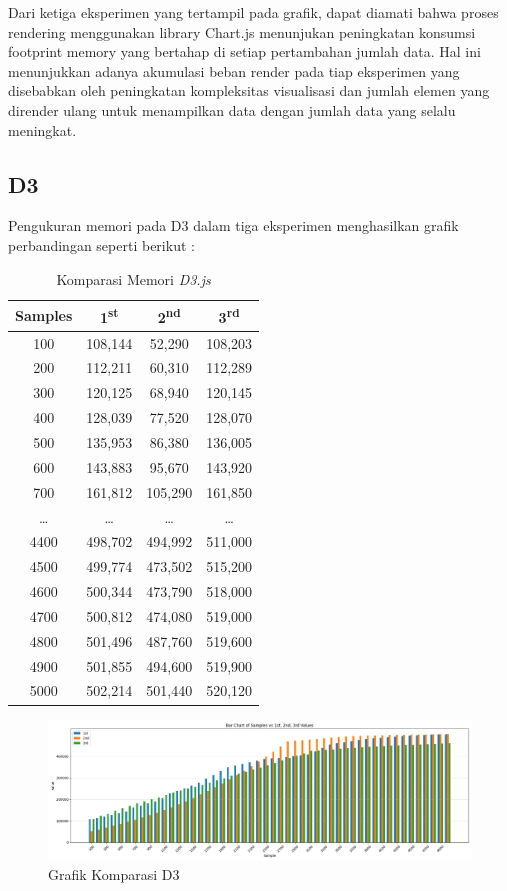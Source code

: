 Dari ketiga eksperimen yang tertampil pada grafik, dapat diamati bahwa proses rendering menggunakan library Chart.js menunjukan peningkatan konsumsi footprint memory yang bertahap di setiap pertambahan jumlah data. Hal ini menunjukkan adanya akumulasi beban render pada tiap eksperimen yang disebabkan oleh peningkatan kompleksitas visualisasi dan jumlah elemen yang dirender ulang untuk menampilkan data dengan jumlah data yang selalu meningkat. 

\subsection{D3}
Pengukuran memori pada D3 dalam tiga eksperimen menghasilkan grafik perbandingan seperti berikut :
\begin{table}[H]
	\centering
	\caption{Komparasi Memori \textit{D3.js}}
	\begin{tabular}{|c|c|c|c|}
		\hline
		\textbf{Samples} & \textbf{1\textsuperscript{st}} & \textbf{2\textsuperscript{nd}} & \textbf{3\textsuperscript{rd}} \\
		\hline
		100  & 108{,}144 &  52{,}290 & 108{,}203 \\
		200  & 112{,}211 &  60{,}310 & 112{,}289 \\
		300  & 120{,}125 &  68{,}940 & 120{,}145 \\
		400  & 128{,}039 &  77{,}520 & 128{,}070 \\
		500  & 135{,}953 &  86{,}380 & 136{,}005 \\
		600  & 143{,}883 &  95{,}670 & 143{,}920 \\
		700  & 161{,}812 & 105{,}290 & 161{,}850 \\
		\ldots & \ldots & \ldots & \ldots \\
		4400 & 498{,}702 & 494{,}992 & 511{,}000 \\
		4500 & 499{,}774 & 473{,}502 & 515{,}200 \\
		4600 & 500{,}344 & 473{,}790 & 518{,}000 \\
		4700 & 500{,}812 & 474{,}080 & 519{,}000 \\
		4800 & 501{,}496 & 487{,}760 & 519{,}600 \\
		4900 & 501{,}855 & 494{,}600 & 519{,}900 \\
		5000 & 502{,}214 & 501{,}440 & 520{,}120 \\
		\hline
	\end{tabular}
\end{table}
	\begin{figure}[H]
	\centering
	\includegraphics[width=0.8\linewidth]{gambar/Pembahasan/FIX_Memori/D3.png}
	\caption{Grafik Komparasi D3}
	\label{Grafik Komparasi D3}
\end{figure}

